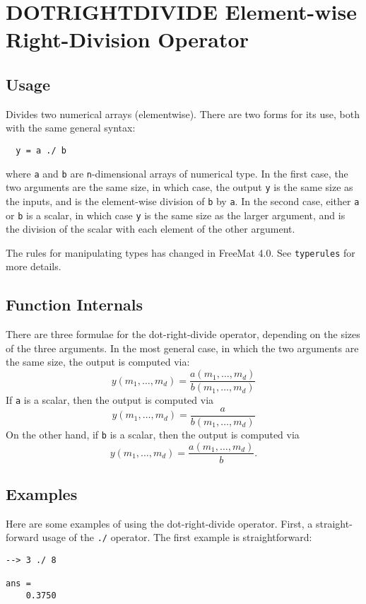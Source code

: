 \section{DOTRIGHTDIVIDE Element-wise Right-Division Operator}

\subsection{Usage}

Divides two numerical arrays (elementwise).  There are two forms
for its use, both with the same general syntax:
\begin{verbatim}
  y = a ./ b
\end{verbatim}
where \verb|a| and \verb|b| are \verb|n|-dimensional arrays of numerical type.  In the
first case, the two arguments are the same size, in which case, the 
output \verb|y| is the same size as the inputs, and is the element-wise
division of \verb|b| by \verb|a|.  In the second case, either \verb|a| or \verb|b| is a scalar, 
in which case \verb|y| is the same size as the larger argument,
and is the division of the scalar with each element of the other argument.

The rules for manipulating types has changed in FreeMat 4.0.  See \verb|typerules|
for more details.

\subsection{Function Internals}

There are three formulae for the dot-right-divide operator, depending on the
sizes of the three arguments.  In the most general case, in which 
the two arguments are the same size, the output is computed via:
\[
y(m_1,\ldots,m_d) = \frac{a(m_1,\ldots,m_d)}{b(m_1,\ldots,m_d)}
\]
If \verb|a| is a scalar, then the output is computed via
\[
y(m_1,\ldots,m_d) = \frac{a}{b(m_1,\ldots,m_d)}
\]
On the other hand, if \verb|b| is a scalar, then the output is computed via
\[
y(m_1,\ldots,m_d) = \frac{a(m_1,\ldots,m_d)}{b}.
\]
\subsection{Examples}

Here are some examples of using the dot-right-divide operator.  First, a 
straight-forward usage of the \verb|./| operator.  The first example
is straightforward:
\begin{verbatim}
--> 3 ./ 8

ans = 
    0.3750 
\end{verbatim}

